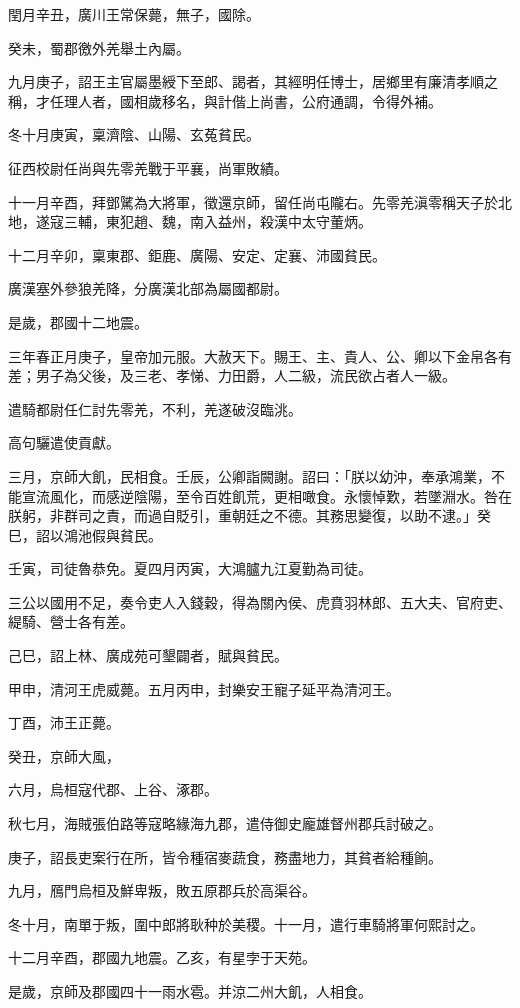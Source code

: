 \begin{pinyinscope}
閏月辛丑，廣川王常保薨，無子，國除。

癸未，蜀郡徼外羌舉土內屬。

九月庚子，詔王主官屬墨綬下至郎、謁者，其經明任博士，居鄉里有廉清孝順之稱，才任理人者，國相歲移名，與計偕上尚書，公府通調，令得外補。

冬十月庚寅，稟濟陰、山陽、玄菟貧民。

征西校尉任尚與先零羌戰于平襄，尚軍敗績。

十一月辛酉，拜鄧騭為大將軍，徵還京師，留任尚屯隴右。先零羌滇零稱天子於北地，遂寇三輔，東犯趙、魏，南入益州，殺漢中太守董炳。

十二月辛卯，稟東郡、鉅鹿、廣陽、安定、定襄、沛國貧民。

廣漢塞外參狼羌降，分廣漢北部為屬國都尉。

是歲，郡國十二地震。

三年春正月庚子，皇帝加元服。大赦天下。賜王、主、貴人、公、卿以下金帛各有差；男子為父後，及三老、孝悌、力田爵，人二級，流民欲占者人一級。

遣騎都尉任仁討先零羌，不利，羌遂破沒臨洮。

高句驪遣使貢獻。

三月，京師大飢，民相食。壬辰，公卿詣闕謝。詔曰：「朕以幼沖，奉承鴻業，不能宣流風化，而感逆陰陽，至令百姓飢荒，更相噉食。永懷悼歎，若墜淵水。咎在朕躬，非群司之責，而過自貶引，重朝廷之不德。其務思變復，以助不逮。」癸巳，詔以鴻池假與貧民。

壬寅，司徒魯恭免。夏四月丙寅，大鴻臚九江夏勤為司徒。

三公以國用不足，奏令吏人入錢穀，得為關內侯、虎賁羽林郎、五大夫、官府吏、緹騎、營士各有差。

己巳，詔上林、廣成苑可墾闢者，賦與貧民。

甲申，清河王虎威薨。五月丙申，封樂安王寵子延平為清河王。

丁酉，沛王正薨。

癸丑，京師大風，

六月，烏桓寇代郡、上谷、涿郡。

秋七月，海賊張伯路等寇略緣海九郡，遣侍御史龐雄督州郡兵討破之。

庚子，詔長吏案行在所，皆令種宿麥蔬食，務盡地力，其貧者給種餉。

九月，鴈門烏桓及鮮卑叛，敗五原郡兵於高渠谷。

冬十月，南單于叛，圍中郎將耿种於美稷。十一月，遣行車騎將軍何熙討之。

十二月辛酉，郡國九地震。乙亥，有星孛于天苑。

是歲，京師及郡國四十一雨水雹。并涼二州大飢，人相食。


\end{pinyinscope}
